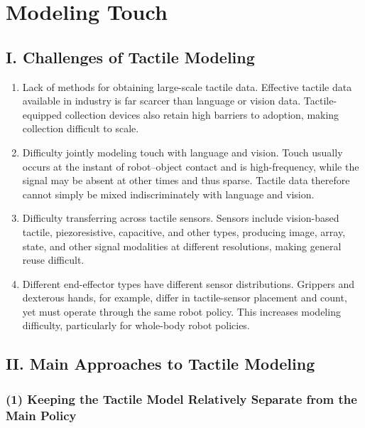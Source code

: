 \setcounter{section}{3}

\hypertarget{modeling-touch}{%
\section{Modeling Touch}\label{modeling-touch}}

\hypertarget{i.-challenges-of-tactile-modeling}{%
\subsection{I. Challenges of Tactile Modeling}\label{i.-challenges-of-tactile-modeling}}

\begin{enumerate}
\def\labelenumi{\arabic{enumi}.}
\item
  Lack of methods for obtaining large-scale tactile data. Effective tactile data available in industry is far scarcer than language or vision data. Tactile-equipped collection devices also retain high barriers to adoption, making collection difficult to scale.
\item
  Difficulty jointly modeling touch with language and vision. Touch usually occurs at the instant of robot--object contact and is high-frequency, while the signal may be absent at other times and thus sparse. Tactile data therefore cannot simply be mixed indiscriminately with language and vision.
\item
  Difficulty transferring across tactile sensors. Sensors include vision-based tactile, piezoresistive, capacitive, and other types, producing image, array, state, and other signal modalities at different resolutions, making general reuse difficult.
\item
  Different end-effector types have different sensor distributions. Grippers and dexterous hands, for example, differ in tactile-sensor placement and count, yet must operate through the same robot policy. This increases modeling difficulty, particularly for whole-body robot policies.
\end{enumerate}

\hypertarget{ii.-main-approaches-to-tactile-modeling}{%
\subsection{II. Main Approaches to Tactile Modeling}\label{ii.-main-approaches-to-tactile-modeling}}

\hypertarget{keeping-the-tactile-model-relatively-separate-from-the-main-policy}{%
\subsubsection{(1) Keeping the Tactile Model Relatively Separate from the Main Policy}\label{keeping-the-tactile-model-relatively-separate-from-the-main-policy}}

